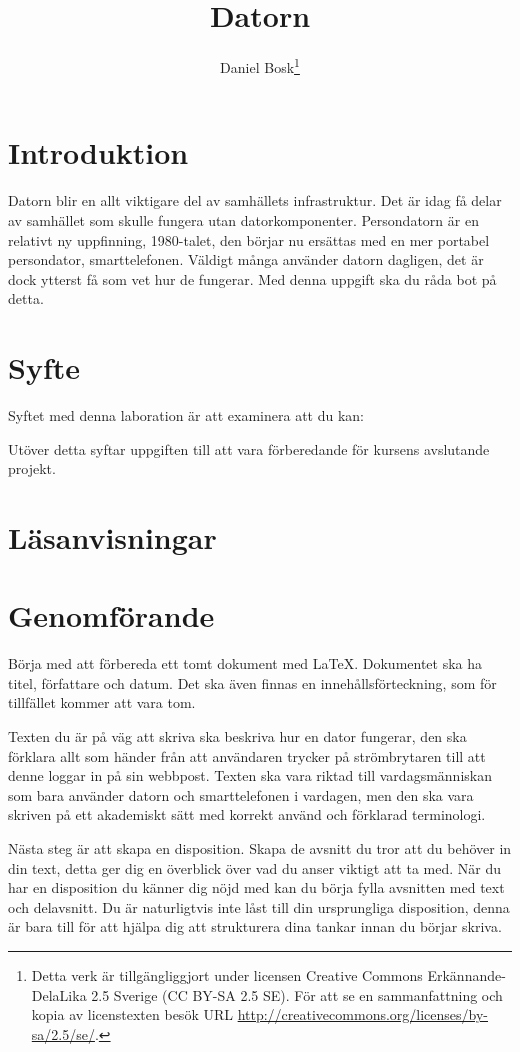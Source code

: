 \documentclass[a4paper,nocourse]{miunasgn}
\title{Datorn}
\author{Daniel Bosk\footnote{%
	Detta verk är tillgängliggjort under licensen Creative Commons 
	Erkännande-DelaLika 2.5 Sverige (CC BY-SA 2.5 SE).
	För att se en sammanfattning och kopia av licenstexten besök URL 
	\url{http://creativecommons.org/licenses/by-sa/2.5/se/}.
}}
\date{\svnId}
\begin{document}
\maketitle
\thispagestyle{foot}
\tableofcontents


\section{Introduktion}
\label{sec:Introduktion}
Datorn blir en allt viktigare del av samhällets infrastruktur.
Det är idag få delar av samhället som skulle fungera utan datorkomponenter.
Persondatorn är en relativt ny uppfinning, 1980-talet, den börjar nu ersättas 
med en mer portabel persondator, smarttelefonen.
Väldigt många använder datorn dagligen, det är dock ytterst få som vet hur de 
fungerar.
Med denna uppgift ska du råda bot på detta.


\section{Syfte}
\label{sec:Syfte}
\noindent
Syftet med denna laboration är att examinera att du kan:
\begin{itemize}
  
\end{itemize}
Utöver detta syftar uppgiften till att vara förberedande för kursens avslutande 
projekt.


\section{Läsanvisningar}
\label{sec:Lasanvisningar}



\section{Genomförande}
\label{sec:Genomforande}
Börja med att förbereda ett tomt dokument med LaTeX.
Dokumentet ska ha titel, författare och datum.
Det ska även finnas en innehållsförteckning, som för tillfället kommer att vara 
tom.

Texten du är på väg att skriva ska beskriva hur en dator fungerar, den ska 
förklara allt som händer från att användaren trycker på strömbrytaren till att 
denne loggar in på sin webbpost.
Texten ska vara riktad till vardagsmänniskan som bara använder datorn och 
smarttelefonen i vardagen, men den ska vara skriven på ett akademiskt sätt med 
korrekt använd och förklarad terminologi.

Nästa steg är att skapa en disposition.
Skapa de avsnitt du tror att du behöver in din text, detta ger dig en överblick 
över vad du anser viktigt att ta med.
När du har en disposition du känner dig nöjd med kan du börja fylla avsnitten 
med text och delavsnitt.
Du är naturligtvis inte låst till din ursprungliga disposition, denna är bara 
till för att hjälpa dig att strukturera dina tankar innan du börjar skriva.
\end{document}
